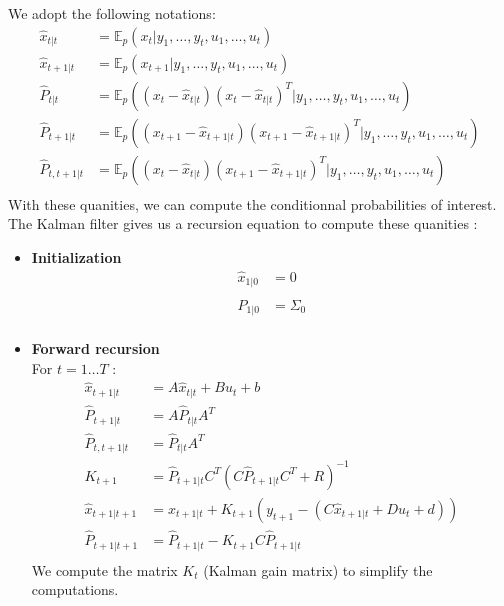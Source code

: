 We adopt the following notations:
\begin{align*}
  \hat{x}_{t|t} &= \mathbb{E}_p \left (x_t|y_1, \ldots , y_t, u_1, \ldots , u_t \right ) \\
  \hat{x}_{t+1|t} &= \mathbb{E}_p \left (x_{t+1}|y_1, \ldots , y_t, u_1, \ldots , u_t \right ) \\
  \hat{P}_{t|t} &= \mathbb{E}_p \left ((x_t - \hat{x}_{t|t})(x_t - \hat{x}_{t|t})^T|y_1, \ldots , y_t, u_1, \ldots , u_t \right ) \\
  \hat{P}_{t+1|t} &= \mathbb{E}_p \left ((x_{t+1} - \hat{x}_{t+1|t})(x_{t+1} - \hat{x}_{t+1|t})^T|y_1, \ldots , y_t, u_1, \ldots , u_t \right ) \\
  \hat{P}_{t,t+1|t} &= \mathbb{E}_p \left ((x_t - \hat{x}_{t|t})(x_{t+1} - \hat{x}_{t+1|t})^T|y_1, \ldots , y_t, u_1, \ldots , u_t \right ) \\
\end{align*}
With these quanities, we can compute the conditionnal probabilities of interest.
The Kalman filter gives us a recursion equation to compute these quanities :
\begin{itemize}
  \item \textbf{Initialization}\\
    \begin{align*}
      \hat{x}_{1|0} &= 0\\
      \hat{P}_{1|0} &= \Sigma_0\\
    \end{align*}
  \item \textbf{Forward recursion}\\
    For $t=1 \ldots T$ :
    \begin{align*}
      \hat{x}_{t+1|t} &= A \hat{x}_{t|t} + B u_t + b\\
      \hat{P}_{t+1|t} &= A \hat{P}_{t|t} A^T\\
      \hat{P}_{t,t+1|t} &= \hat{P}_{t|t}A^T\\
      K_{t+1} &= \hat{P}_{t+1|t}C^T(C \hat{P}_{t+1|t} C^T + R)^{-1}\\
      \hat{x}_{t+1|t+1} &= x_{t+1|t} + K_{t+1} \left (y_{t+1} - (C\hat{x}_{t+1|t} + D u_t + d) \right )\\
      \hat{P}_{t+1|t+1} &= \hat{P}_{t+1|t} - K_{t+1} C \hat{P}_{t+1|t}\\
    \end{align*}
    We compute the matrix $K_{t}$ (Kalman gain matrix) to simplify the computations.
\end{itemize}

